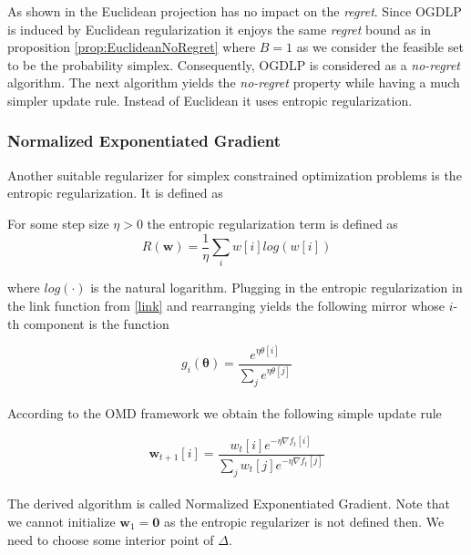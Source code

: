 As shown in \cite[Cor. 2.17]{shalev} the Euclidean projection has no impact on the \textit{regret}. Since OGDLP is induced by Euclidean regularization it enjoys the same \textit{regret} bound as in proposition \ref{prop:EuclideanNoRegret} where $B = 1$ as we consider the feasible set to be the probability simplex. Consequently, OGDLP is considered as a \textit{no-regret} algorithm. The next algorithm yields the \textit{no-regret} property while having a much simpler update rule. Instead of Euclidean it uses entropic regularization.


\subsubsection{Normalized Exponentiated Gradient}\label{subsubsection:normalizedExponentiatedGradient}

Another suitable regularizer for simplex constrained optimization problems is the entropic regularization. It is defined as 

\begin{definition}\label{def:entropicReg}
    For some step size $\eta > 0$ the entropic regularization term is defined as
    \[R(\boldsymbol{w}) = \frac{1}{\eta} \sum_{i}w[i]log(w[i])\]
\end{definition}

where $log(\cdot)$ is the natural logarithm. Plugging in the entropic regularization in the link function from \ref{link} and rearranging yields the following mirror whose $i$-th component is the function \cite{shalev}

\begin{equation*}
    g_i(\boldsymbol{\theta}) = \frac{e^{\eta\theta[i]}}{\sum_{j}e^{\eta\theta[j]}}
\end{equation*} \\

According to the OMD framework we obtain the following simple update rule \cite{shalev}

\begin{equation*}
    \boldsymbol{w}_{t+1}[i] = \frac{w_t[i]e^{-\eta\nabla f_t[i]}}{\sum_{j}w_t[j]e^{-\eta\nabla f_t[j]}}
\end{equation*} \\

The derived algorithm is called Normalized Exponentiated Gradient. Note that we cannot initialize $\boldsymbol{w}_1 = \boldsymbol{0}$ as the entropic regularizer is not defined then. We need to choose some interior point of $\Delta$. \\

